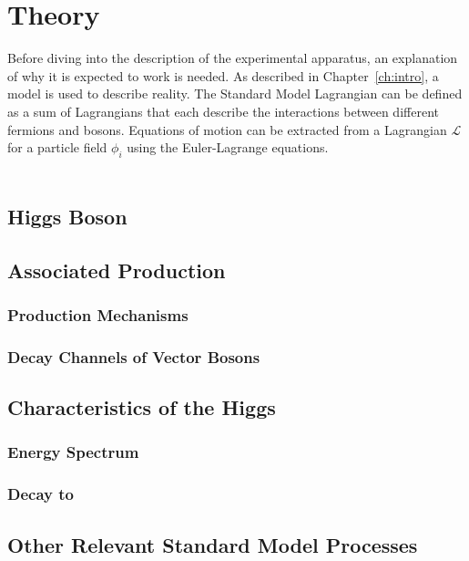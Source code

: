 \chapter{Theory} \label{ch:theory}

Before diving into the description of the experimental apparatus,
an explanation of why it is expected to work is needed.
As described in Chapter~\ref{ch:intro}, a model is used to describe reality.
The Standard Model Lagrangian can be defined as a sum of Lagrangians that each describe
the interactions between different fermions and bosons.
Equations of motion can be extracted from a Lagrangian $\mathcal{L}$ for a particle field $\phi_i$
using the Euler-Lagrange equations.

\begin{gather}
    
\end{gather}

\section{Higgs Boson}



\section{Associated Production}

\subsection{Production Mechanisms}

\subsection{Decay Channels of Vector Bosons}

\section{Characteristics of the Higgs}

\subsection{Energy Spectrum}

\subsection{Decay to \bb}

\section{Other Relevant Standard Model Processes}
